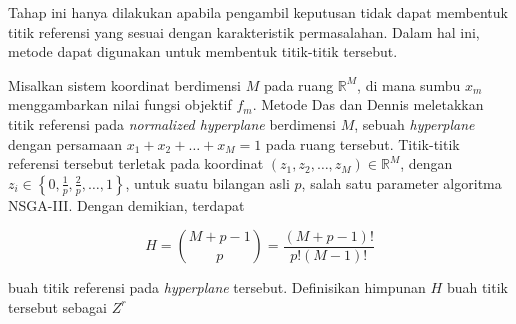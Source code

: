 Tahap ini hanya dilakukan apabila pengambil keputusan tidak dapat membentuk titik referensi yang sesuai dengan karakteristik permasalahan. Dalam hal ini, metode \citep{DasDennis1998} dapat digunakan untuk membentuk titik-titik tersebut.  

Misalkan sistem koordinat berdimensi $M$ pada ruang $\mathbb{R}^M$, di mana sumbu $x_m$ menggambarkan nilai fungsi objektif $f_m$. Metode Das dan Dennis meletakkan titik referensi pada \textit{normalized hyperplane} berdimensi $M$, sebuah \textit{hyperplane} dengan persamaan $x_1+x_2+\dots+x_M=1$  pada ruang tersebut. Titik-titik referensi tersebut terletak pada koordinat $(z_1,z_2,\dots,z_M)\in \mathbb{R}^M$, dengan $z_i\in\left\{0,\frac{1}{p},\frac{2}{p},\dots,1\right\}$, untuk suatu bilangan asli $p$, salah satu parameter algoritma NSGA-III. Dengan demikian, terdapat 

\begin{equation}
  H = {M+p-1 \choose p} = \frac{(M+p-1)!}{p!(M-1)!}
\end{equation}

buah titik referensi pada \textit{hyperplane} tersebut. Definisikan himpunan $H$ buah titik tersebut sebagai $Z^r$

